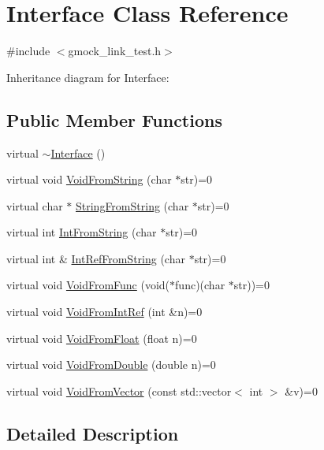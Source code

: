 \hypertarget{class_interface}{}\section{Interface Class Reference}
\label{class_interface}


{\ttfamily \#include $<$gmock\+\_\+link\+\_\+test.\+h$>$}



Inheritance diagram for Interface\+:
\subsection*{Public Member Functions}
\begin{DoxyCompactItemize}
\item 
virtual \hyperlink{class_interface_a67eca71a4ef8d28dc959dd495e2b2b59}{$\sim$\+Interface} ()
\item 
virtual void \hyperlink{class_interface_a65d6ae604e7e9a513aec72c9c94e0b97}{Void\+From\+String} (char $\ast$str)=0
\item 
virtual char $\ast$ \hyperlink{class_interface_a756b1d22c12aa3f14a5083f90043fbf0}{String\+From\+String} (char $\ast$str)=0
\item 
virtual int \hyperlink{class_interface_ab34c8a5fd2236a6b009f86a4e5851b61}{Int\+From\+String} (char $\ast$str)=0
\item 
virtual int \& \hyperlink{class_interface_ab93276de67e60c44fd775d4c139aa8e1}{Int\+Ref\+From\+String} (char $\ast$str)=0
\item 
virtual void \hyperlink{class_interface_a7dab3c82b857a9a5f52b3ce6f7df547f}{Void\+From\+Func} (void($\ast$func)(char $\ast$str))=0
\item 
virtual void \hyperlink{class_interface_aa43fb56650a57b6b3e7743e54e50cb86}{Void\+From\+Int\+Ref} (int \&n)=0
\item 
virtual void \hyperlink{class_interface_ae2b3e9411c893a45642d3af632752c66}{Void\+From\+Float} (float n)=0
\item 
virtual void \hyperlink{class_interface_aa56524017aabdbe46510648c711ab8a8}{Void\+From\+Double} (double n)=0
\item 
virtual void \hyperlink{class_interface_ae84fe7e53f881db2f823ad35d004927a}{Void\+From\+Vector} (const std\+::vector$<$ int $>$ \&v)=0
\end{DoxyCompactItemize}


\subsection{Detailed Description}


